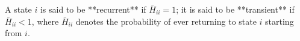 A state $i$ is said to be **recurrent** if $\bar{H}_{ii} = 1$; it is said to be **transient** if $\bar{H}_{ii} < 1$, where $\bar{H}_{ii}$ denotes the probability of ever returning to state $i$ starting from $i$.
